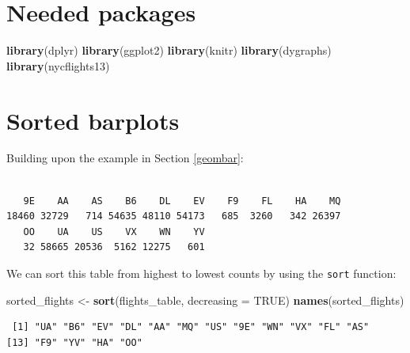 \documentclass[12pt, krantz2,]{krantz}
\makeatletter
\newenvironment{Shaded}{\begin{snugshade}}{\end{snugshade}}
\newcommand{\DataTypeTok}[1]{\textcolor[rgb]{0.27,0.27,0.27}{#1}}
\newcommand{\KeywordTok}[1]{\textcolor[rgb]{0.27,0.27,0.27}{\textbf{#1}}}
\newcommand{\NormalTok}[1]{#1}
\newcommand{\OperatorTok}[1]{\textcolor[rgb]{0.43,0.43,0.43}{\textbf{#1}}}
\newcommand{\OtherTok}[1]{\textcolor[rgb]{0.37,0.37,0.37}{#1}}
\newcommand{\StringTok}[1]{\textcolor[rgb]{0.5,0.5,0.5}{#1}}
\newenvironment{kframe}{%
\medskip{}
\setlength{\fboxsep}{.8em}
 \def\at@end@of@kframe{}%
 \ifinner\ifhmode%
  \def\at@end@of@kframe{\end{minipage}}%
  \begin{minipage}{\columnwidth}%
 \fi\fi%
 \def\FrameCommand##1{\hskip\@totalleftmargin \hskip-\fboxsep
 \colorbox{shadecolor}{##1}\hskip-\fboxsep
     \hskip-\linewidth \hskip-\@totalleftmargin \hskip\columnwidth}%
 \MakeFramed {\advance\hsize-\width
   \@totalleftmargin\z@ \linewidth\hsize
   \@setminipage}}%
 {\par\unskip\endMakeFramed%
 \at@end@of@kframe}
\renewenvironment{Shaded}{\begin{kframe}}{\end{kframe}}
\makeatother
\begin{document}
\hypertarget{needed-packages-12}{%
\section*{Needed packages}\label{needed-packages-12}}


\begin{Shaded}
\begin{Highlighting}[]
\KeywordTok{library}\NormalTok{(dplyr)}
\KeywordTok{library}\NormalTok{(ggplot2)}
\KeywordTok{library}\NormalTok{(knitr)}
\KeywordTok{library}\NormalTok{(dygraphs)}
\KeywordTok{library}\NormalTok{(nycflights13)}
\end{Highlighting}
\end{Shaded}

\hypertarget{sorted-barplots}{%
\section{Sorted barplots}\label{sorted-barplots}}

Building upon the example in Section \ref{geombar}:

\begin{Shaded}
\end{Shaded}

\begin{verbatim}

   9E    AA    AS    B6    DL    EV    F9    FL    HA    MQ 
18460 32729   714 54635 48110 54173   685  3260   342 26397 
   OO    UA    US    VX    WN    YV 
   32 58665 20536  5162 12275   601 
\end{verbatim}

We can sort this table from highest to lowest counts by using the \texttt{sort} function:

\begin{Shaded}
\begin{Highlighting}[]
\NormalTok{sorted_flights <-}\StringTok{ }\KeywordTok{sort}\NormalTok{(flights_table, }\DataTypeTok{decreasing =} \OtherTok{TRUE}\NormalTok{)}
\KeywordTok{names}\NormalTok{(sorted_flights)}
\end{Highlighting}
\end{Shaded}

\begin{verbatim}
 [1] "UA" "B6" "EV" "DL" "AA" "MQ" "US" "9E" "WN" "VX" "FL" "AS"
[13] "F9" "YV" "HA" "OO"
\end{verbatim}
\end{document}
